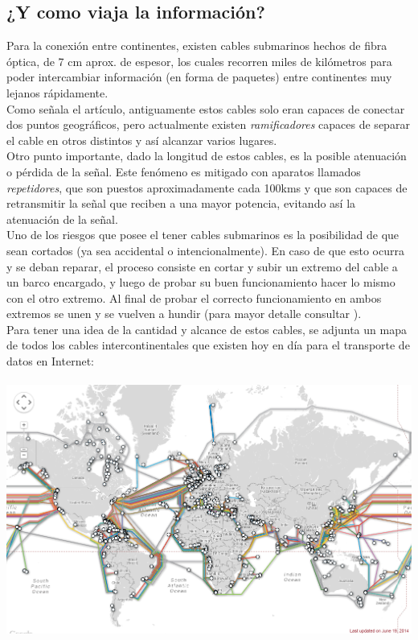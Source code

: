 \documentclass{article}
\begin{document}
\subsection{¿Y como viaja la información?}

Para la conexión entre continentes, existen cables submarinos hechos de fibra óptica, de 7 cm aprox. de espesor, los cuales recorren miles de kilómetros para poder intercambiar información (en forma de paquetes) entre continentes muy lejanos rápidamente. \cite{CAB} \\ Como señala el artículo, antiguamente estos cables solo eran capaces de conectar dos puntos geográficos, pero actualmente existen \emph{ramificadores} capaces de separar el cable en otros distintos y así alcanzar varios lugares.\\
Otro punto importante, dado la longitud de estos cables, es la posible atenuación o pérdida de la señal. Este fenómeno es mitigado con aparatos llamados \emph{repetidores}, que son puestos aproximadamente cada 100kms y que son capaces de retransmitir la señal que reciben a una mayor potencia, evitando así la atenuación de la señal.\\
Uno de los riesgos que posee el tener cables submarinos es la posibilidad de que sean cortados (ya sea accidental o intencionalmente). En caso de que esto ocurra y se deban reparar, el proceso consiste en cortar y subir un extremo del cable a un barco encargado, y luego de probar su buen funcionamiento hacer lo mismo con el otro extremo. Al final de probar el correcto funcionamiento en ambos extremos se unen y se vuelven a hundir (para mayor detalle consultar \cite{REP}).\\
Para tener una idea de la cantidad y alcance de estos cables, se adjunta un mapa de todos los cables intercontinentales que existen hoy en día para el transporte de datos en Internet:\cite{MAP} \\\\
\includegraphics[scale=0.7]{Img/map-world.png} 
\end{document}
